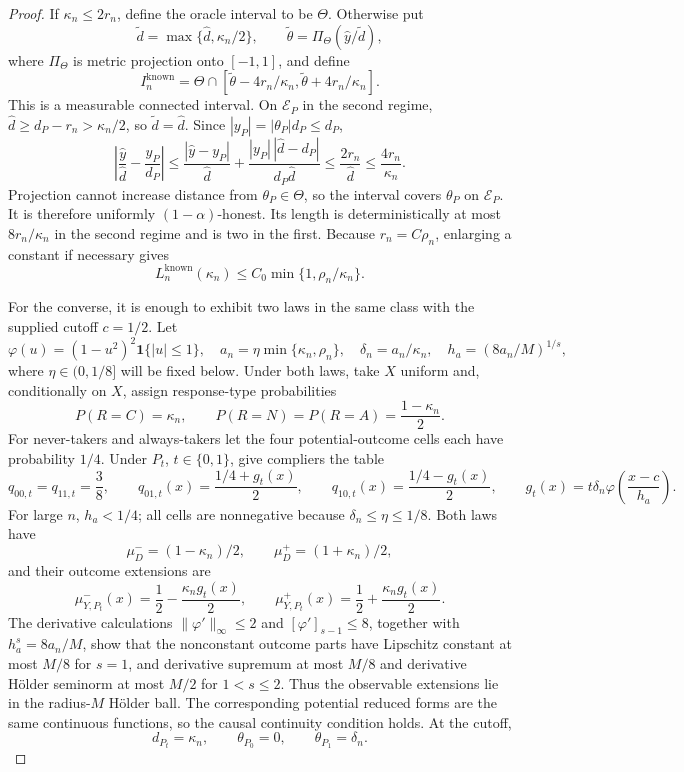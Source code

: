 \documentclass{article}
\begin{document}
\begin{proof}
If \(\kappa_n\le2r_n\), define the oracle interval to be \(\Theta\).  Otherwise put
\[
 \widetilde d=\max\{\widehat d,\kappa_n/2\},\qquad
 \widetilde\theta=\Pi_\Theta(\widehat y/\widetilde d),
\]
where \(\Pi_\Theta\) is metric projection onto \([-1,1]\), and define
\[
 I_n^{\mathrm{known}}=
 \Theta\cap[\widetilde\theta-4r_n/\kappa_n,
              \widetilde\theta+4r_n/\kappa_n].
\]
This is a measurable connected interval.  On \(\mathcal E_P\) in the second regime, \(\widehat d\ge d_P-r_n>\kappa_n/2\), so \(\widetilde d=\widehat d\).  Since \(|y_P|=|\theta_P|d_P\le d_P\),
\[
 \left|\frac{\widehat y}{\widehat d}-\frac{y_P}{d_P}\right|
 \le\frac{|\widehat y-y_P|}{\widehat d}
 +\frac{|y_P|\,|\widehat d-d_P|}{d_P\widehat d}
 \le\frac{2r_n}{\widehat d}\le\frac{4r_n}{\kappa_n}.
\]
Projection cannot increase distance from \(\theta_P\in\Theta\), so the interval covers \(\theta_P\) on \(\mathcal E_P\).  It is therefore uniformly \((1-\alpha)\)-honest.  Its length is deterministically at most \(8r_n/\kappa_n\) in the second regime and is two in the first.  Because \(r_n=C\rho_n\), enlarging a constant if necessary gives
\[
 L_n^{\mathrm{known}}(\kappa_n)\le C_0\min\{1,\rho_n/\kappa_n\}.
\]

For the converse, it is enough to exhibit two laws in the same class with the supplied cutoff \(c=1/2\).  Let
\[
 \varphi(u)=(1-u^2)^2\mathbf 1\{|u|\le1\},\quad
 a_n=\eta\min\{\kappa_n,\rho_n\},\quad
 \delta_n=a_n/\kappa_n,\quad
 h_a=(8a_n/M)^{1/s},
\]
where \(\eta\in(0,1/8]\) will be fixed below.  Under both laws, take \(X\) uniform and, conditionally on \(X\), assign response-type probabilities
\[
 P(R=C)=\kappa_n,\qquad P(R=N)=P(R=A)=\frac{1-\kappa_n}{2}.
\]
For never-takers and always-takers let the four potential-outcome cells each have probability \(1/4\).  Under \(P_t\), \(t\in\{0,1\}\), give compliers the table
\[
 q_{00,t}=q_{11,t}=\frac38,\qquad
 q_{01,t}(x)=\frac{1/4+g_t(x)}2,\qquad
 q_{10,t}(x)=\frac{1/4-g_t(x)}2,\qquad
 g_t(x)=t\delta_n\varphi\left(\frac{x-c}{h_a}\right).
\]
For large \(n\), \(h_a<1/4\); all cells are nonnegative because \(\delta_n\le\eta\le1/8\).  Both laws have
\[
 \mu_D^-=(1-\kappa_n)/2,\qquad \mu_D^+=(1+\kappa_n)/2,
\]
and their outcome extensions are
\[
 \mu_{Y,P_t}^-(x)=\frac12-\frac{\kappa_ng_t(x)}2,\qquad
 \mu_{Y,P_t}^+(x)=\frac12+\frac{\kappa_ng_t(x)}2.
\]
The derivative calculations \(\lVert\varphi'\rVert_\infty\le2\) and \([\varphi']_{s-1}\le8\), together with \(h_a^s=8a_n/M\), show that the nonconstant outcome parts have Lipschitz constant at most \(M/8\) for \(s=1\), and derivative supremum at most \(M/8\) and derivative H\"older seminorm at most \(M/2\) for \(1<s\le2\).  Thus the observable extensions lie in the radius-\(M\) H\"older ball.  The corresponding potential reduced forms are the same continuous functions, so the causal continuity condition holds.  At the cutoff,
\[
 d_{P_t}=\kappa_n,\qquad \theta_{P_0}=0,\qquad \theta_{P_1}=\delta_n.
\]


\end{proof}
\end{document}
